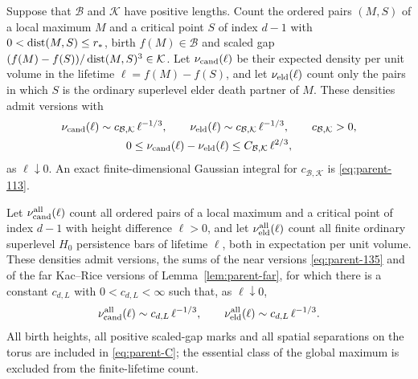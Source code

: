 \begin{theorem}\label{thm:parent-B}
Suppose that $\mathcal B$ and $\mathcal K$ have positive lengths. Count the ordered pairs $(M,S)$ of a local maximum $M$ and a critical point $S$ of index $d-1$ with $0<\operatorname{dist}(M,S)\le r_*$, birth $f(M)\in\mathcal B$ and scaled gap $(f(M)-f(S))/\operatorname{dist}(M,S)^3\in\mathcal K$. Let $\nu_{\mathrm{cand}}(\ell)$ be their expected density per unit volume in the lifetime $\ell=f(M)-f(S)$, and let $\nu_{\mathrm{eld}}(\ell)$ count only the pairs in which $S$ is the ordinary superlevel elder death partner of $M$. These densities admit versions with
\begin{equation}\label{eq:parent-B}
\begin{gathered}
\nu_{\mathrm{cand}}(\ell)\sim c_{\mathcal B,\mathcal K}\,\ell^{-1/3},\qquad \nu_{\mathrm{eld}}(\ell)\sim c_{\mathcal B,\mathcal K}\,\ell^{-1/3},\qquad c_{\mathcal B,\mathcal K}>0,\\
0\le\nu_{\mathrm{cand}}(\ell)-\nu_{\mathrm{eld}}(\ell)\le C_{\mathcal B,\mathcal K}\,\ell^{2/3},
\end{gathered}
\end{equation}
as $\ell\downarrow0$. An exact finite-dimensional Gaussian integral for $c_{\mathcal B,\mathcal K}$ is \eqref{eq:parent-113}.
\end{theorem}

\begin{theorem}\label{thm:parent-C}
Let $\nu^{\rm all}_{\mathrm{cand}}(\ell)$ count all ordered pairs of a local maximum and a critical point of index $d-1$ with height difference $\ell>0$, and let $\nu^{\rm all}_{\mathrm{eld}}(\ell)$ count all finite ordinary superlevel $H_0$ persistence bars of lifetime $\ell$, both in expectation per unit volume. These densities admit versions, the sums of the near versions \eqref{eq:parent-135} and of the far Kac--Rice versions of Lemma~\ref{lem:parent-far}, for which there is a constant $c_{d,L}$ with $0<c_{d,L}<\infty$ such that, as $\ell\downarrow0$,
\begin{equation}\label{eq:parent-C}
\nu^{\rm all}_{\mathrm{cand}}(\ell)\sim c_{d,L}\,\ell^{-1/3},\qquad \nu^{\rm all}_{\mathrm{eld}}(\ell)\sim c_{d,L}\,\ell^{-1/3}.
\end{equation}
All birth heights, all positive scaled-gap marks and all spatial separations on the torus are included in \eqref{eq:parent-C}; the essential class of the global maximum is excluded from the finite-lifetime count.
\end{theorem}

